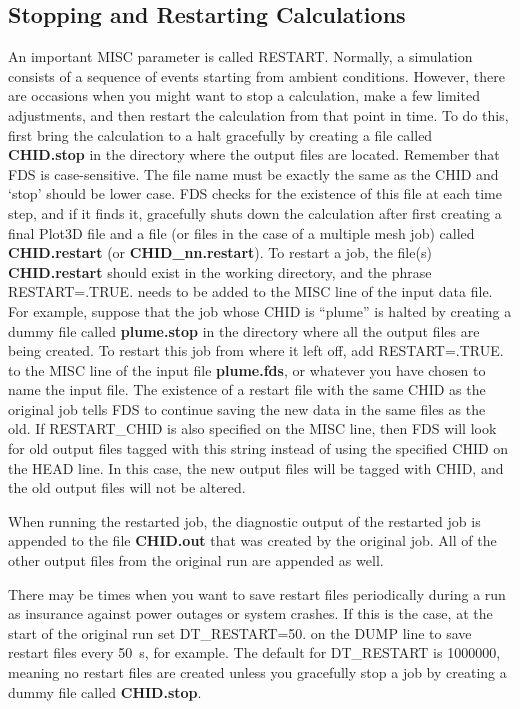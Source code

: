 \documentclass[11pt]{book}
\begin{document}
\subsection{Stopping and Restarting Calculations}
\label{info:restart}

An important {\ct MISC} parameter is called {\ct RESTART}. Normally, a simulation consists of a sequence of events
starting from ambient conditions. However, there are occasions
when you might want to stop a calculation, make a few
limited adjustments, and then
restart the calculation from that point in time. To do this,
first bring the calculation to a halt gracefully by creating a file
called {\bf CHID.stop}
in the directory where the output files are located. Remember that
FDS is case-sensitive. The file name must be exactly the same as
the {\ct CHID} and `stop' should be lower case. FDS checks for the
existence of this file at each time step, and if it finds it, gracefully
shuts down the calculation after first creating a final Plot3D
file and a file (or files in the case of a multiple mesh job)
called {\bf CHID.restart} (or {\bf CHID\_nn.restart}).
To restart a job, the file(s) {\bf CHID.restart} should exist in
the working directory, and
the phrase {\ct RESTART=.TRUE.} needs to be added
to the {\ct MISC} line of the input data file.
For example, suppose that the job
whose {\ct CHID} is ``plume'' is halted by creating a
dummy file called {\bf plume.stop} in the directory where
all the output files are being created. To restart this job from where it
left off, add {\ct RESTART=.TRUE.} to the {\ct MISC} line
of the input file {\bf plume.fds}, or whatever you have chosen to
name the input file. The existence of a restart file with the same
{\ct CHID} as the original job tells FDS
to continue saving the new data in the same files as the old.  If {\ct RESTART\_CHID} is also specified on the
{\ct MISC} line, then FDS will look for old output files tagged with this string instead of using the specified
{\ct CHID} on the {\ct HEAD} line. In this case, the new output files will be tagged with {\ct CHID}, and the
old output files will not be altered.

When running the restarted job, the diagnostic
output of the restarted job is appended to the file {\bf CHID.out} that was created by
the original job.
All of the other output files from the original run are appended as well.

There may be times when you want to save restart files periodically
during a run as insurance against power outages or system crashes.
If this is the case, at the start of the original run
set {\ct DT\_RESTART=50.} on the {\ct DUMP} line to save restart files
every 50~s, for example.
The default for {\ct DT\_RESTART} is 1000000, meaning no restart files are
created unless you gracefully stop a job by
creating a dummy file called {\bf CHID.stop}.
\end{document}
